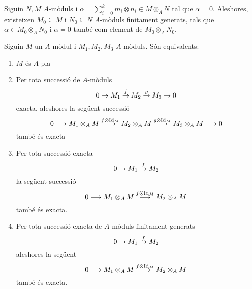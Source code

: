 \documentclass[../../../main.tex]{subfiles}
\begin{document}
\begin{lema}
\label{lema:tensorialFinitamentGenerats} Siguin $N,M$ $A$-mòduls i $\alpha= \sum_{i=0}^km_i\otimes n_i\in M\otimes_AN$ tal que $\alpha = 0$. Aleshores, existeixen $M_0\subseteq M$ i $N_0\subseteq N$ $A$-mòduls finitament generats, tals que $\alpha\in M_0\otimes_A N_0$ i $\alpha = 0$ també com element de $M_0\otimes_AN_0$.
\end{lema}

\begin{ter}
\label{ter:equivalentPlaExacte}
Siguin $M$ un $A$-mòdul i $M_1,M_2,M_3$ $A$-mòduls. Són equivalents:
\begin{enumerate}[(1)]
    \item $M$ és $A$-pla
    \item Per tota successió de $A$-mòduls
    \begin{equation}
        \notag
        0\to M_1\overset{f}{\to}M_2\overset{g}{\to}M_3\to 0
    \end{equation}
    exacta, aleshores la següent successió
    \begin{equation}
        \notag
        0\longrightarrow M_1\otimes_AM\overset{f\otimes \operatorname{Id}_M}{\longrightarrow}M_2\otimes_AM\overset{g\otimes\operatorname{Id}_M}{\longrightarrow}M_3\otimes_AM\longrightarrow 0
    \end{equation}
    també és exacta
    \item Per tota successió exacta
    \begin{equation}
        \notag
        0\to M_1\overset{f}{\to}M_2
    \end{equation}
    la següent successió
    \begin{equation}
        \notag
        0\longrightarrow M_1\otimes_AM\overset{f\otimes\operatorname{Id}_M}{\longrightarrow}M_2\otimes_AM
    \end{equation}
    també és exacta.
    \item Per tota successió exacta de $A$-mòduls finitament generats
    \begin{equation}
        \notag
        0\to M_1\overset{f}{\to}M_2
    \end{equation}
    aleshores la següent
    \begin{equation}
        \notag
        0\longrightarrow M_1\otimes_AM\overset{f\otimes\operatorname{Id}_M}{\longrightarrow}M_2\otimes_AM
    \end{equation}
    també és exacta.
\end{enumerate}
\end{ter}
\end{document}
